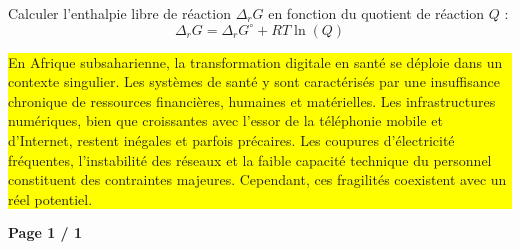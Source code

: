 \documentclass[12pt,a4paper]{article}
\begin{document}
	Calculer l’enthalpie libre de réaction $\Delta_r G$ en fonction du quotient de réaction $Q$ :
	\[
	\Delta_r G = \Delta_r G^\circ + RT \ln(Q)
	\]
	
	\vspace{1cm}
	
	\noindent
	\colorbox{yellow}{
		\parbox{\textwidth}{
			En Afrique subsaharienne, la transformation digitale en santé se déploie dans un contexte singulier. Les systèmes de santé y sont caractérisés par une insuffisance chronique de ressources financières, humaines et matérielles. Les infrastructures numériques, bien que croissantes avec l’essor de la téléphonie mobile et d’Internet, restent inégales et parfois précaires. Les coupures d’électricité fréquentes, l’instabilité des réseaux et la faible capacité technique du personnel constituent des contraintes majeures. Cependant, ces fragilités coexistent avec un réel potentiel.
		}
	}
	
	\vspace{1cm}
	
	\begin{flushright}
		\textbf{Page 1 / 1}
	\end{flushright}
	
\end{document}
